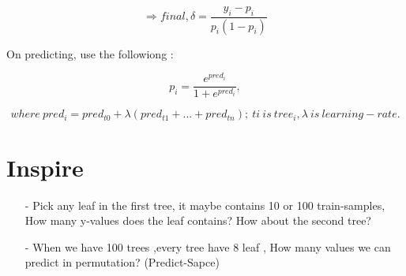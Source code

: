 \documentclass{article}
\begin{document}
\begin{equation}
\Rightarrow  final,  {\delta}  =  \frac{ {y_i} - {p_i}}{{p_i}(1-{p_i})}
\end{equation}


On predicting,  use the followiong : 

\begin{equation}
{p_i} =\frac{e^{pred_i}}{1+ e^{pred_i}},   
\end{equation}

\begin{equation}
where\ {pred_i} =  {pred_{t0}} + {\lambda} ( {pred_{t1}} + ... + {pred_{tn}});\ ti\ is\ tree_i , {\lambda}\ is\ learning-rate.
\end{equation}


\section{Inspire}
\begin{itemize}  
\item[-] Pick any leaf in the first tree, it maybe contains 10  or 100 train-samples,  How many y-values does the leaf contains?   How about the second tree?
\item[-] When we have 100 trees ,every tree have 8 leaf , How many values we can predict in permutation? (Predict-Sapce) 
\end{itemize}  
\end{document}
